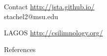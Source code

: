 \documentclass[bigger]{beamer}
\begin{document}
\begin{frame}
\vspace{3em}
\begin{block}{Contact}
   \href{http://jsta.github.io/}{http://jsta.github.io/}\\
   stachel2@msu.edu
\end{block}

\vspace{2em}

\begin{block}{LAGOS}
  \href{http://csilimnology.org/}{http://csilimnology.org/}
\end{block}

\vspace{2em}

\begin{block}{References}
\end{block}

\end{frame}
\end{document}

